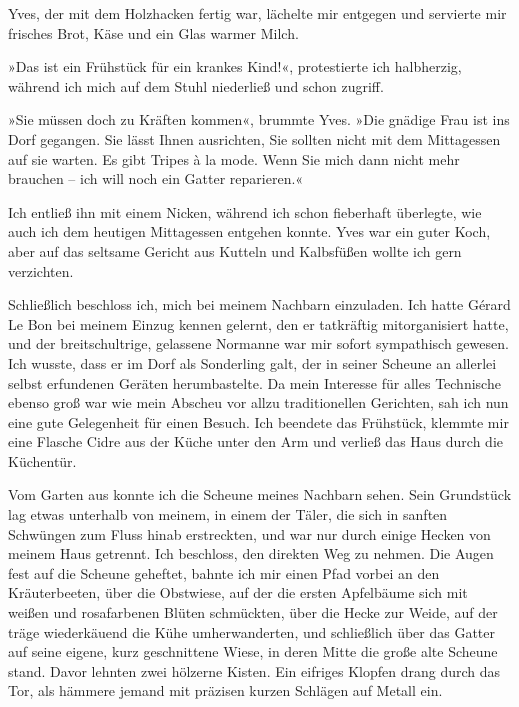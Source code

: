 \bigpar

Yves, der mit dem Holzhacken fertig war, lächelte mir entgegen und
servierte mir frisches Brot, Käse und ein Glas warmer Milch.

»Das ist ein Frühstück für ein krankes Kind!«, protestierte ich
halbherzig, während ich mich auf dem Stuhl niederließ und schon
zugriff.

»Sie müssen doch zu Kräften kommen«, brummte Yves. »Die gnädige
Frau ist ins Dorf gegangen. Sie lässt Ihnen ausrichten, Sie sollten
nicht mit dem Mittagessen auf sie warten. Es gibt Tripes à la mode.
Wenn Sie mich dann nicht mehr brauchen – ich will noch ein Gatter
reparieren.«

Ich entließ ihn mit einem Nicken, während ich schon fieberhaft
überlegte, wie auch ich dem heutigen Mittagessen entgehen konnte.
Yves war ein guter Koch, aber auf das seltsame Gericht aus Kutteln
und Kalbsfüßen wollte ich gern verzichten.

Schließlich beschloss ich, mich bei meinem Nachbarn einzuladen. Ich
hatte Gérard Le Bon bei meinem Einzug kennen gelernt, den er
tatkräftig mitorganisiert hatte, und der breitschultrige, gelassene
Normanne war mir sofort sympathisch gewesen. Ich wusste, dass er im
Dorf als Sonderling galt, der in seiner Scheune an allerlei selbst
erfundenen Geräten herumbastelte. Da mein Interesse für alles
Technische ebenso groß war wie mein Abscheu vor allzu
traditionellen Gerichten, sah ich nun eine gute Gelegenheit für
einen Besuch. Ich beendete das Frühstück, klemmte mir eine Flasche
Cidre aus der Küche unter den Arm und verließ das Haus durch die
Küchentür.

\bigpar

Vom Garten aus konnte ich die Scheune meines Nachbarn sehen. Sein
Grundstück lag etwas unterhalb von meinem, in einem der Täler, die
sich in sanften Schwüngen zum Fluss hinab erstreckten, und war nur
durch einige Hecken von meinem Haus getrennt. Ich beschloss, den
direkten Weg zu nehmen. Die Augen fest auf die Scheune geheftet,
bahnte ich mir einen Pfad vorbei an den Kräuterbeeten, über die
Obstwiese, auf der die ersten Apfelbäume sich mit weißen und
rosafarbenen Blüten schmückten, über die Hecke zur Weide, auf der
träge wiederkäuend die Kühe umherwanderten, und schließlich über
das Gatter auf seine eigene, kurz geschnittene Wiese, in deren
Mitte die große alte Scheune stand. Davor lehnten zwei hölzerne
Kisten. Ein eifriges Klopfen drang durch das Tor, als hämmere
jemand mit präzisen kurzen Schlägen auf Metall ein.


